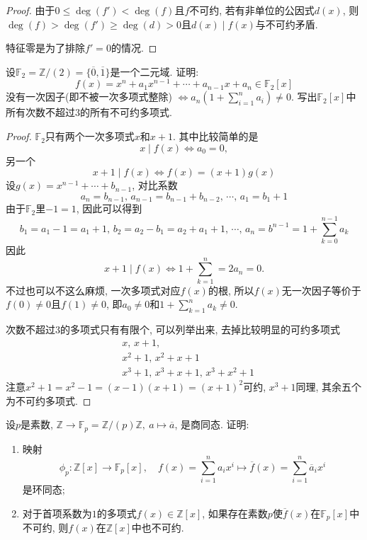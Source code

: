 \documentclass{../solutions-cn}
\begin{document}
\begin{proof}
    由于$0 \leqslant \deg(f') < \deg(f)$且$f$不可约, 若有非单位的公因式$d(x)$, 则$\deg(f) > \deg(f') \geqslant \deg(d) > 0$且$d(x) \mid f(x)$与不可约矛盾.

    特征零是为了排除$f' = 0$的情况.
\end{proof}

\begin{exercise}[习题2.3.5]
    设$\mathbb{F}_2 = \mathbb{Z}/(2) = \{\overline{0}, \overline{1}\}$是一个二元域. 证明: 
    \[
        f(x) = x^n + a_1x^{n - 1} + \cdots + a_{n - 1}x + a_n \in \mathbb{F}_2[x]
    \]
    没有一次因子(即不被一次多项式整除)
    \(
        \Leftrightarrow a_n\left(1 + \sum_{i = 1}^n a_i\right) \neq 0.
    \)
    写出$\mathbb{F}_2[x]$中所有次数不超过$3$的所有不可约多项式.
\end{exercise}

\begin{proof}
    $\mathbb{F}_2$只有两个一次多项式$x$和$x + 1$. 其中比较简单的是
    \[
        x \mid f(x) \iff a_0 = 0,
    \]
    另一个
    \[
        x + 1 \mid f(x) \iff f(x) = (x + 1)g(x)
    \]
    设$g(x) = x^{n - 1} + \cdots + b_{n - 1}$, 对比系数
    \[
        a_n = b_{n - 1},\, a_{n - 1} = b_{n - 1} + b_{n - 2},\, \cdots,\, a_{1} = b_1 + 1
    \]
    由于$\mathbb{F}_2$里$-1 = 1$, 因此可以得到
    \[
        b_1 = a_1 - 1 = a_1 + 1,\, b_2 = a_2 - b_1 = a_2 + a_1 + 1,\, \cdots,\, a_n = b^{n - 1} = 1 + \sum_{k = 0}^{n - 1} a_k
    \]
    因此
    \[
        x + 1 \mid f(x) \iff 1 + \sum_{k = 1}^{n} = 2a_n = 0.
    \]
    不过也可以不这么麻烦, 一次多项式对应$f(x)$的根, 所以$f(x)$无一次因子等价于$f(0) \neq 0$且$f(1) \neq 0$, 即$a_0 \neq 0$和$1 + \sum_{k = 1}^{n} a_k \neq 0$.

    次数不超过$3$的多项式只有有限个, 可以列举出来, 去掉比较明显的可约多项式
    \[
    \begin{aligned}
        &x,\, x + 1,\\
        &x^2 + 1,\, x^2 + x + 1\\
        &x^3 + 1,\, x^3 + x + 1,\, x^3 + x^2 + 1
    \end{aligned}
    \]
    注意$x^2 + 1 = x^2 - 1 = (x - 1)(x + 1) = (x + 1)^2$可约, $x^3 + 1$同理, 其余五个为不可约多项式.
\end{proof}

\begin{exercise}[习题2.3.6]
    设$p$是素数, $\mathbb{Z} \to \mathbb{F}_p = \mathbb{Z}/(p)\mathbb{Z},~a \mapsto \overline{a}$, 是商同态. 证明: 
    \begin{enumerate}[(1)]
        \item 映射
        \[
            \phi_p:\mathbb{Z}[x] \to \mathbb{F}_p[x],\quad f(x) = \sum_{i = 1}^n a_ix^i \mapsto \overline{f}(x) = \sum_{i = 1}^n \overline{a}_ix^i
        \]
        是环同态;
        \item 对于首项系数为$1$的多项式$f(x) \in \mathbb{Z}[x]$, 如果存在素数$p$使$\overline{f}(x)$在$\mathbb{F}_p[x]$中不可约, 则$f(x)$在$\mathbb{Z}[x]$中也不可约.
    \end{enumerate}
\end{exercise}
\end{document}
